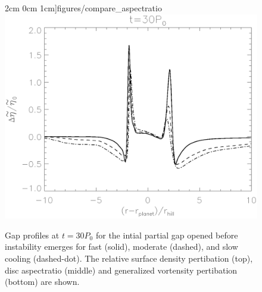 \begin{figure}
    2cm 0cm 1cm]{figures/compare_aspectratio}
\includegraphics[width=\linewidth,clip=true,trim=0.5cm
    0.5cm 0cm 1cm]{figures/compare_gvortensity}
  \caption{Gap profiles at $t=30P_0$ for the intial partial gap opened
    before instability emerges for fast (solid), moderate
    (dashed), and slow cooling (dashed-dot). The relative surface density
    pertibation (top), disc aspectratio (middle) and generalized
    vortensity pertibation (bottom) are shown. \label{intial1D}}  
\end{figure}




